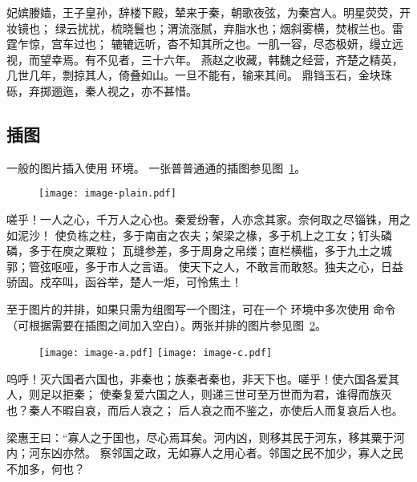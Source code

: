 妃嫔媵嫱，王子皇孙，辞楼下殿，辇来于秦，朝歌夜弦，为秦宫人。明星荧荧，开妆镜也；
绿云扰扰，梳晓鬟也；渭流涨腻，弃脂水也；烟斜雾横，焚椒兰也。雷霆乍惊，宫车过也；
辘辘远听，杳不知其所之也。一肌一容，尽态极妍，缦立远视，而望幸焉。有不见者，三十六年。
燕赵之收藏，韩魏之经营，齐楚之精英，几世几年，剽掠其人，倚叠如山。一旦不能有，输来其间。
鼎铛玉石，金块珠砾，弃掷逦迤，秦人视之，亦不甚惜。

\subsection{插图}\label{subsec:fig}

一般的图片插入使用  环境。
一张普普通通的插图参见图~\ref{fig:a-single-image}。

\begin{figure}[H]
	\centering
	\texttt{[image: image-plain.pdf]}
	\label{fig:a-single-image}
\end{figure}

嗟乎！一人之心，千万人之心也。秦爱纷奢，人亦念其家。奈何取之尽锱铢，用之如泥沙！
使负栋之柱，多于南亩之农夫；架梁之椽，多于机上之工女；钉头磷磷，多于在庾之粟粒；
瓦缝参差，多于周身之帛缕；直栏横槛，多于九土之城郭；管弦呕哑，多于市人之言语。
使天下之人，不敢言而敢怒。独夫之心，日益骄固。戍卒叫，函谷举，楚人一炬，可怜焦土！

至于图片的并排，如果只需为组图写一个图注，可在一个  环境中多次使用  命令（可根据需要在插图之间加入空白）。两张并排的图片参见图~\ref{fig:abreast-image}。

\begin{figure}[htbp]
	\centering
	\texttt{[image: image-a.pdf]}
	\hspace{1cm}
	\texttt{[image: image-c.pdf]}
	\label{fig:abreast-image}
\end{figure}

呜呼！灭六国者六国也，非秦也；族秦者秦也，非天下也。嗟乎！使六国各爱其人，则足以拒秦；
使秦复爱六国之人，则递三世可至万世而为君，谁得而族灭也？秦人不暇自哀，而后人哀之；
后人哀之而不鉴之，亦使后人而复哀后人也。

梁惠王曰：“寡人之于国也，尽心焉耳矣。河内凶，则移其民于河东，移其粟于河内；河东凶亦然。
察邻国之政，无如寡人之用心者。邻国之民不加少，寡人之民不加多，何也？

